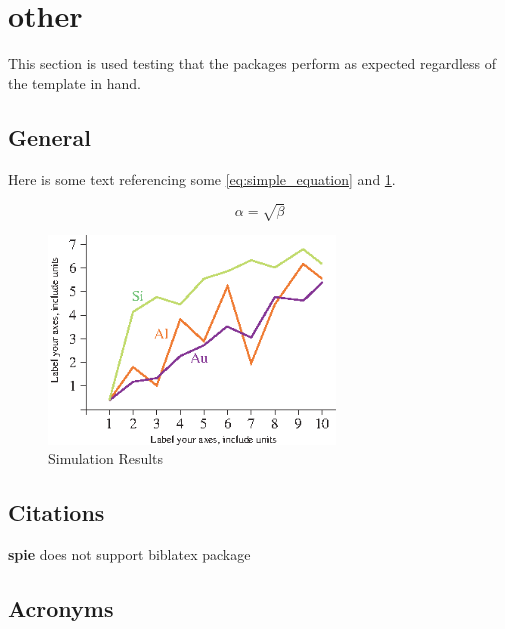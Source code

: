 \graphicspath{ {./content/other/figures/} }

\section{other}
\label{sec:other}  %

This section is used testing that the packages perform as expected regardless of the template in hand.

\subsection{General}
\label{sec:other:general}
Here is some text referencing some \cref{eq:simple_equation} and \cref{fig:simulationfigure}.

\begin{equation}
    \label{eq:simple_equation}
    \alpha = \sqrt{ \beta }
\end{equation}

\begin{figure}
    \centering
    \includegraphics[width=3.0in]{fig_1}
    \caption{Simulation Results}
    \label{fig:simulationfigure}
\end{figure}

\subsection{Citations}
\label{sec:other:citations}
%
\textbf{spie} does not support biblatex package

\subsection{Acronyms}
\label{sec:other:acro}




